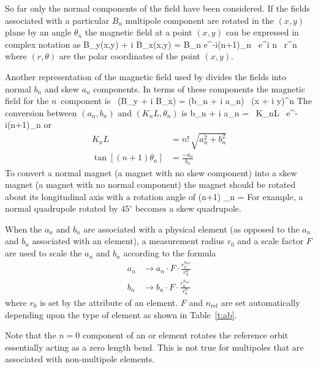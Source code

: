 So far only the normal components of the field have been
considered. If the fields associated with a particular $B_n$ multipole
component are rotated in the $(x, y)$ plane by an angle $\theta_n$ the
magnetic field at a point $(x,y)$ can be expressed in complex notation
as
\Begineq
  B_y(x,y) + i B_x(x,y) = 
                 B_n e^{-i(n+1)\theta_n} \, e^{i n \theta} \, r^n 
\Endeq
where $(r, \theta)$ are the polar coordinates of the point $(x, y)$.

Another representation of the magnetic field used by \bmad divides
the fields into normal $b_n$ and skew $a_n$ components. In terms of
these components the magnetic field for the $n$\Th\ component is
\Begineq
   \, (B_y + i B_x) = (b_n + i a_n) \, (x + i y)^n
\Endeq
The conversion between $(a_n, b_n)$ and $(K_nL, \theta_n)$ is
\Begineq
  b_n + i a_n =  \, K_nL \, e^{-i(n+1)\theta_n}
\Endeq
or
\begin{align}
  K_n L &= n! \, \sqrt{a_n^2 + b_n^2} \\
  \tan[(n+1) \theta_n] &= \frac{-a_n}{b_n}
\end{align}
To convert a normal magnet (a magnet with no skew component) into a skew
magnet (a magnet with no normal component) the magnet should be rotated
about its longitudinal axis with a rotation angle of
\Begineq
  (n+1) \theta_n = 
\Endeq
For example, a normal quadrupole rotated by $45^\circ$ becomes a
skew quadrupole.

When the $a_n$ and $b_n$ are associated with a physical element (as
opposed to the $a_n$ and $b_n$ associated with an  element),
a measurement radius $r_0$ and a scale factor $F$ are used to scale
the $a_n$ and $b_n$ according to the formula
\begin{align}
  a_n &\rightarrow 
        a_n \cdot F \cdot \frac{r_0^{n_\text{ref}}}{r_0^n} \nonumber \\
  b_n &\rightarrow 
        b_n \cdot F \cdot \frac{r_0^{n_\text{ref}}}{r_0^n}
\end{align}
where $r_0$ is set by the  attribute of an element. $F$ and
$n_\text{ref}$ are set automatically depending upon the type of
element as shown in Table~\ref{t:ab}.

Note that the $n = 0$ component of an  or 
element rotates the reference orbit essentially acting as a zero length bend.
This is not true for multipoles that are associated with 
non-multipole elements.

